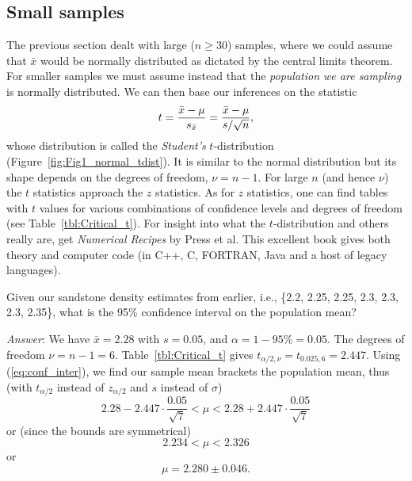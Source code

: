 \subsection{Small samples}

	The previous section dealt with large ($n \geq 30$) samples, where we could assume that $\bar{x}$ would be 
normally distributed as dictated by the central limits theorem.  For smaller samples we must 
assume instead that the \emph{population we are sampling} is normally distributed.  We can then base our 
inferences on the statistic
\begin{equation}
	\index{Student's $t$ distribution}
	\index{Test!Student's $t$}
	\index{Probability distribution!Student's $t$}
t = \frac{\bar{x} - \mu}{s_{\bar{x}}} = \frac{\bar{x} - \mu}{s/ \sqrt{n}},
\end{equation}
whose distribution is called the \emph{Student's} $t$-distribution (Figure~\ref{fig:Fig1_normal_tdist}).  It is similar to the normal distribution but 
its shape depends on the degrees of freedom, $\nu = n -1$.  For large $n$ (and hence $\nu$) the $t$ 
statistics approach the $z$ statistics.  As for $z$ statistics, one can find tables with $t$ values 
for various combinations of confidence levels and degrees of freedom (see Table~\ref{tbl:Critical_t}).  For insight into what the $t$-distribution
and others really are, get \emph{Numerical Recipes} by Press et al.  This excellent book gives both 
theory and computer code (in C++, C, FORTRAN, Java and a host of legacy languages).
\begin{example}
Given our sandstone density estimates from earlier, i.e., \{2.2, 2.25, 2.25, 2.3, 2.3, 2.3, 2.35\}, what is 
the 95\% confidence interval on the population mean?

\emph{Answer}:  We have $\bar{x} = 2.28$ with $s = 0.05$, and $\alpha = 1 - 95\% = 0.05$.  The degrees of freedom $\nu = n - 1 = 6$.
Table~\ref{tbl:Critical_t} gives $t_{\alpha/2,\nu} = t_{0.025,6} = 2.447$.
Using (\ref{eq:conf_inter}), we find our sample mean brackets the population mean, thus (with $t_{\alpha/2}$
instead of  $z_{\alpha/2}$ and $s$ instead of $\sigma$)
\begin{equation}
2.28 - 2.447 \cdot \frac{0.05}{\sqrt{7}} < \mu < 2.28 + 2.447 \cdot \frac{0.05}{\sqrt{7}}
\end{equation}	 
or (since the bounds are symmetrical)
\begin{equation}
2.234 < \mu < 2.326
\label{eq:conf_interval}
\end{equation}	 
or 
\begin{equation}
\mu = 2.280 \pm 0.046.
\end{equation}
\end{example}


